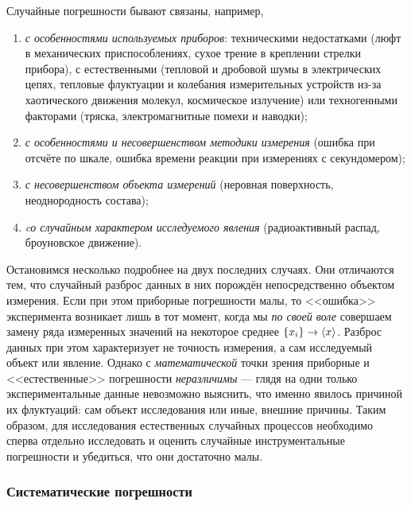 Случайные погрешности бывают связаны, например,
\begin{enumerate}

    \item \emph{с особенностями используемых приборов}: техническими недостатками
(люфт в механических приспособлениях, сухое трение в креплении стрелки
прибора), с естественными (тепловой и дробовой шумы в электрических
цепях, тепловые флуктуации и колебания измерительных устройств из-за
хаотического движения молекул, космическое излучение) или техногенными
факторами (тряска, электромагнитные помехи и наводки);

    \item \emph{с особенностями и несовершенством методики измерения} (ошибка
при отсчёте по шкале, ошибка времени реакции при измерениях с секундомером);

    \item \emph{с несовершенством объекта измерений} (неровная поверхность,
неоднородность состава);

    \item \emph{cо случайным характером исследуемого явления} (радиоактивный
распад, броуновское движение).

\end{enumerate}

Остановимся несколько подробнее на двух последних случаях. Они отличаются
тем, что случайный разброс данных в них порождён непосредственно объектом
измерения. Если при этом приборные погрешности малы, то <<ошибка>>
эксперимента возникает лишь в тот момент, когда мы \emph{по своей
воле} совершаем замену ряда измеренных значений на некоторое среднее
$\left\{ x_{i}\right\} \to\left<x\right>$. Разброс данных при этом
характеризует не точность измерения, а сам исследуемый объект или
явление. Однако с \emph{математической} точки зрения приборные и <<естественные>>
погрешности \emph{неразличимы} --- глядя на одни только
экспериментальные данные невозможно выяснить, что именно явилось причиной
их флуктуаций: сам объект исследования или иные, внешние причины.
Таким образом, для исследования естественных случайных процессов необходимо
сперва отдельно исследовать и оценить случайные инструментальные погрешности
и убедиться, что они достаточно малы.


\subsubsection{Систематические погрешности}

